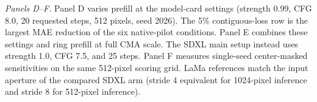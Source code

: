 \begin{landscape}
\smallskip\noindent\textit{Panels D--F.} Panel D varies prefill at the model-card settings (strength 0.99, CFG 8.0, 20 requested steps, 512 pixels, seed 2026). The 5\% contiguous-loss row is the largest MAE reduction of the six native-pilot conditions. Panel E combines these settings and ring prefill at full CMA scale. The SDXL main setup instead uses strength 1.0, CFG 7.5, and 25 steps. Panel F measures single-seed center-masked sensitivities on the same 512-pixel scoring grid. LaMa references match the input aperture of the compared SDXL arm (stride 4 equivalent for 1024-pixel inference and stride 8 for 512-pixel inference).
\endgroup
\end{landscape}
